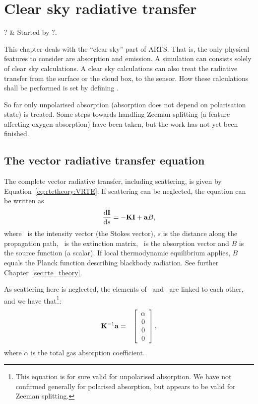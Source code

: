 \chapter{Clear sky radiative transfer}
 \label{sec:rte}


\starthistory
  ? & Started by ?. \\
\stophistory


This chapter deals with the ``clear sky'' part of ARTS. That is, the
only physical features to consider are absorption and emission. A
simulation can consists solely of clear sky calculations. A clear sky
calculations can also treat the radiative transfer from the surface or
the cloud box, to the sensor. How these calculations shall be
performed is set by defining . 

So far only unpolarised absorption (absorption does not depend on
polarisation state) is treated. Some steps towards handling Zeeman
splitting (a feature affecting oxygen absorption) have been taken, but
the work has not yet been finished.



\section{The vector radiative transfer equation}
\label{sec:rte:vrte}

The complete vector radiative transfer, including scattering, is given
by Equation~\ref{eq:rtetheory:VRTE}. If scattering can be neglected,
the equation can be written as
\begin{equation}
  \label{eq:rte:vrte}
  \frac {\mathrm{d}{\bf I}}{\mathrm{d} s} = -{\bf K}{\bf I} + {\bf a} B,
\end{equation}
where \StoVec\ is the intensity vector (the Stokes vector), $s$ is the
distance along the propagation path, \ExtMat\ is the extinction
matrix, \AbsVec\ is the absorption vector and $B$ is the source
function (a scalar). If local thermodynamic equilibrium applies, $B$
equals the Planck function describing blackbody radiation. See further
Chapter~\ref{sec:rte_theory}.

As scattering here is neglected, the elements of \ExtMat\ and \AbsVec\ 
are linked to each other, and we have that\footnote{This equation is
  for sure valid for unpolarised absorption. We have not confirmed
  generally for polarised absorption, but appears to be valid for
  Zeeman splitting.}:
\begin{eqnarray*}
  {\bf K}^{-1}{\bf a} &=& \left[\begin{array}{c} \alpha\\0\\0\\0 \end{array}\right],
\end{eqnarray*}
where $\alpha$ is the total gas absorption coefficient. 



